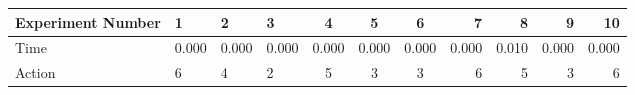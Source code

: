 \documentclass[8pt]{article}
\begin{document}
\begin{landscape}
\begin{tabular}{ | l | l | l | l | c | c | c | r | r | r | r | }
 \hline 
Experiment Number & 1 & 2 & 3 & 4 & 5 & 6 & 7 & 8 & 9 & 10\\ \hline
Time & 0.000 & 0.000 & 0.000 & 0.000 & 0.000 & 0.000 & 0.000 & 0.010 & 0.000 & 0.000\\ \hline
Action & 6 & 4 & 2 & 5 & 3 & 3 & 6 & 5 & 3 & 6\\ \hline\end{tabular}
\end{landscape}
\end{document}
